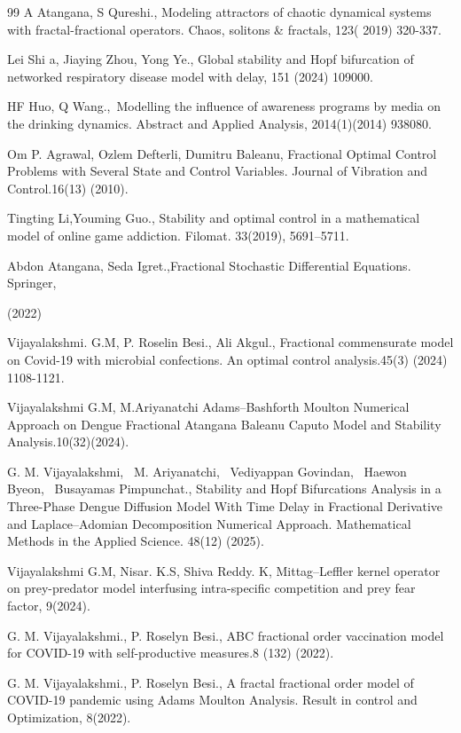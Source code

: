 \documentclass[10pt]{NSP1}
\begin{document}
\begin{thebibliography}{99}
A Atangana, S Qureshi., Modeling attractors of chaotic dynamical systems with fractal-fractional operators. Chaos, solitons \& fractals, 123( 2019) 320-337.

Lei Shi a, Jiaying Zhou, Yong Ye., Global stability and Hopf bifurcation of networked respiratory disease model with delay, 151 (2024) 109000.

HF Huo, Q Wang., Modelling the inﬂuence of awareness programs by media on the drinking dynamics. Abstract and Applied Analysis, 2014(1)(2014) 938080.

Om P. Agrawal, Ozlem Defterli, Dumitru Baleanu, Fractional Optimal Control Problems with Several State and Control Variables. Journal of Vibration and Control.16(13) (2010).

Tingting Li,Youming Guo., Stability and optimal control in a mathematical model of online game addiction. Filomat. 33(2019), 5691–5711.

Abdon Atangana, Seda Igret.,Fractional Stochastic Diﬀerential Equations. Springer,

(2022)

Vijayalakshmi. G.M, P. Roselin Besi., Ali Akgul., Fractional commensurate model on Covid-19 with microbial confections. An optimal control analysis.45(3) (2024) 1108-1121.

Vijayalakshmi G.M, M.Ariyanatchi Adams–Bashforth Moulton Numerical Approach on Dengue Fractional Atangana Baleanu Caputo Model and Stability Analysis.10(32)(2024).

G. M. Vijayalakshmi,  M. Ariyanatchi,  Vediyappan Govindan,  Haewon Byeon,  Busayamas Pimpunchat., Stability and Hopf Bifurcations Analysis in a Three-Phase Dengue Diffusion Model With Time Delay in Fractional Derivative and Laplace–Adomian Decomposition Numerical Approach. Mathematical Methods in the Applied Science. 48(12) (2025).

Vijayalakshmi G.M, Nisar. K.S, Shiva Reddy. K, Mittag–Leffler kernel operator on prey-predator model interfusing intra-specific competition and prey fear factor, 9(2024).

G. M. Vijayalakshmi., P. Roselyn Besi., ABC fractional order vaccination model for COVID-19 with self-productive measures.8 (132) (2022).

G. M. Vijayalakshmi., P. Roselyn Besi., A fractal fractional order model of COVID-19 pandemic using Adams Moulton Analysis. Result in control and Optimization, 8(2022).

\end{thebibliography}
\end{document}
